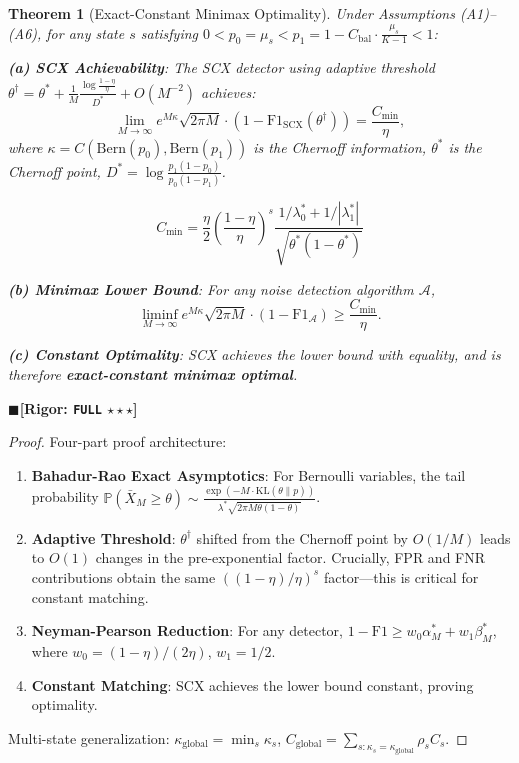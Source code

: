 \documentclass[12pt,a4paper]{article}
\newtheorem{theorem}{Theorem}[section]
\theoremstyle{definition}
\theoremstyle{remark}
\newcommand{\rigorFull}{$\blacksquare$\;\textbf{[Rigor: \texttt{FULL} $\star\star\star$]}}
\begin{document}
\begin{theorem}[Exact-Constant Minimax Optimality]
\label{thm:4}
Under Assumptions (A1)--(A6), for any state $s$ satisfying $0 < p_0 = \mu_s < p_1 = 1 - C_{\text{bal}} \cdot \frac{\mu_s}{K-1} < 1$:

\textbf{(a) SCX Achievability}: The SCX detector using adaptive threshold $\theta^\dagger = \theta^* + \frac{1}{M}\frac{\log\frac{1-\eta}{\eta}}{D^*} + O(M^{-2})$ achieves:
\begin{equation}
\lim_{M\to\infty} e^{M\kappa}\sqrt{2\pi M} \cdot (1 - \mathrm{F1}_{\text{SCX}}(\theta^\dagger)) = \frac{C_{\min}}{\eta},
\end{equation}
where $\kappa = C(\mathrm{Bern}(p_0), \mathrm{Bern}(p_1))$ is the Chernoff information, $\theta^*$ is the Chernoff point, $D^* = \log\frac{p_1(1-p_0)}{p_0(1-p_1)}$.

\begin{equation}
\boxed{C_{\min} = \frac{\eta}{2}\left(\frac{1-\eta}{\eta}\right)^s \frac{1/\lambda_0^* + 1/|\lambda_1^*|}{\sqrt{\theta^*(1-\theta^*)}}}
\end{equation}

\textbf{(b) Minimax Lower Bound}: For \textit{any} noise detection algorithm $\mathcal{A}$,
\begin{equation}
\liminf_{M\to\infty} e^{M\kappa}\sqrt{2\pi M} \cdot (1 - \mathrm{F1}_{\mathcal{A}}) \geq \frac{C_{\min}}{\eta}.
\end{equation}

\textbf{(c) Constant Optimality}: SCX achieves the lower bound with equality, and is therefore \textbf{exact-constant minimax optimal}.
\end{theorem}
\rigorFull

\begin{proof}
Four-part proof architecture:
\begin{enumerate}[label=\arabic*.]
\item \textbf{Bahadur-Rao Exact Asymptotics}: For Bernoulli variables, the tail probability $\mathbb{P}(\bar{X}_M \geq \theta) \sim \frac{\exp(-M\cdot\mathrm{KL}(\theta\|p))}{\lambda^*\sqrt{2\pi M\theta(1-\theta)}}$.
\item \textbf{Adaptive Threshold}: $\theta^\dagger$ shifted from the Chernoff point by $O(1/M)$ leads to $O(1)$ changes in the pre-exponential factor. Crucially, FPR and FNR contributions obtain the same $((1-\eta)/\eta)^s$ factor---this is critical for constant matching.
\item \textbf{Neyman-Pearson Reduction}: For any detector, $1-\mathrm{F1} \geq w_0\alpha_M^* + w_1\beta_M^*$, where $w_0=(1-\eta)/(2\eta)$, $w_1=1/2$.
\item \textbf{Constant Matching}: SCX achieves the lower bound constant, proving optimality.
\end{enumerate}
Multi-state generalization: $\kappa_{\text{global}} = \min_s \kappa_s$, $C_{\text{global}} = \sum_{s: \kappa_s = \kappa_{\text{global}}} \rho_s C_s$.
\end{proof}
\end{document}

